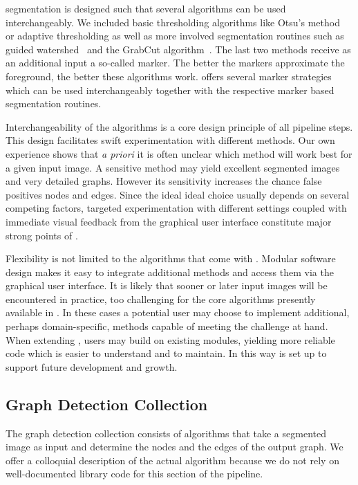 		\NEFIs segmentation is designed such that several algorithms can be used interchangeably. We included basic thresholding algorithms like Otsu's method~\cite{otsu1979} or adaptive thresholding as well as more involved segmentation routines such as guided watershed~\cite{watershed91} and the GrabCut algorithm~\cite{grabcut2004}. The last two methods receive as an additional input a so-called marker. The better the markers approximate the foreground, the better these algorithms work. \NEFI offers several marker strategies which can be used interchangeably together with the respective marker based segmentation routines. 

		Interchangeability of the algorithms is a core design principle of all pipeline steps. This design facilitates swift experimentation with different methods. Our own experience shows that \emph{a priori} it is often unclear which method will work best for a given input image. A sensitive method may yield excellent segmented images and very detailed graphs. However its sensitivity increases the chance false positives nodes and edges. Since the ideal ideal choice usually depends on several competing factors, targeted experimentation with different settings coupled with immediate visual feedback from the graphical user interface constitute major strong points of \NEFI.

		Flexibility is not limited to the algorithms that come with \NEFI. Modular software design makes it easy to integrate additional methods and access them via the graphical user interface. It is likely that sooner or later input images will be encountered in practice, too challenging for the core algorithms presently available in \NEFI. In these cases a potential user may choose to implement additional, perhaps domain-specific, methods capable of meeting the challenge at hand. When extending \NEFI, users may build on existing modules, yielding more reliable code which is easier to understand and to maintain. In this way \NEFI is set up to support future development and growth.

	\subsection{Graph Detection Collection} 

		The graph detection collection consists of algorithms that take a segmented image as input and determine the nodes and the edges of the output graph. We offer a colloquial description of the actual algorithm because we do not rely on well-documented library code for this section of the pipeline. 

